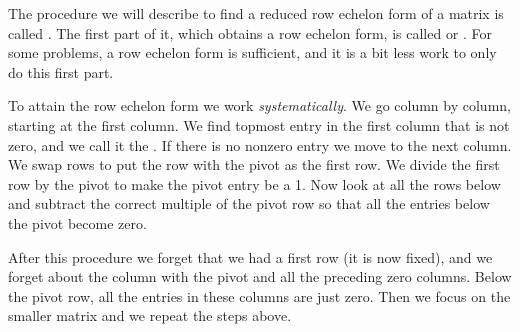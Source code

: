 The procedure we will describe to find a reduced row echelon form
of a matrix
is called \emph{}.
The first part of it, which obtains a row echelon form, is called 
\emph{} or
\emph{}.  For some problems, a row echelon
form is sufficient, and it is a bit less work to only do this first part.

To attain the row echelon form we work \emph{systematically}.
We go column by column, starting at the first column.  We find topmost
entry in the first column that is not zero, and we call it the
\emph{}.  If there is no nonzero entry
we move to the next column.  We swap rows to put the row with
the pivot as the first row.  We divide the first row
by the pivot to make the pivot entry be a 1.  Now look at all the rows below
and subtract the correct multiple of the pivot row so that all the entries
below the pivot become zero.

After this procedure we forget that we had a first row (it is now fixed),
and we forget about the column with the pivot and all the preceding zero
columns.
Below the pivot row, all the entries in these columns are just
zero.  Then we focus on the smaller matrix and we repeat the steps
above.

